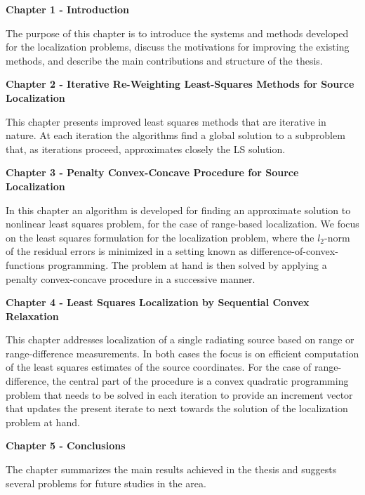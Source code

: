 \phantom{m}

\noindent
\textbf{Chapter 1 - Introduction}

\phantom{m}

\noindent
The purpose of this chapter is to introduce the systems and methods developed for the localization problems, discuss the motivations for improving the existing methods, and describe the main contributions and structure of the thesis.


\phantom{m}

\noindent
\textbf{Chapter 2 - Iterative Re-Weighting Least-Squares Methods for Source Localization}


\phantom{m}

\noindent
This chapter presents improved least squares methods that are iterative in nature. At each iteration the algorithms find a global solution to a subproblem that, as iterations proceed, approximates closely the LS solution.


\phantom{m}

\noindent
\textbf{Chapter 3 - Penalty Convex-Concave Procedure for Source Localization}


\phantom{m}

\noindent
In this chapter an algorithm is developed for finding an approximate solution to nonlinear least squares problem, for the case of range-based localization. We focus on the least squares formulation for the localization problem, where the $l_2$-norm of the residual errors is minimized in a setting known as difference-of-convex-functions programming. The problem at hand is then solved by applying a penalty convex-concave procedure in a successive manner.


\phantom{m}

\noindent
\textbf{Chapter 4 - Least Squares Localization by Sequential Convex Relaxation}


\phantom{m}

\noindent
This chapter addresses localization of a single radiating source based on range or range-difference measurements. In both cases the focus is on efficient computation of the least squares estimates of the source coordinates. For the case of range-difference, the central part of the procedure is a convex quadratic programming problem that needs to be solved in each iteration to provide an increment vector that updates the present iterate to next towards the solution of the localization problem at hand.

\phantom{m}

\noindent
\textbf{Chapter 5 - Conclusions}

\phantom{m}

\noindent
The chapter summarizes the main results achieved in the thesis and suggests several problems for future studies in the area.
